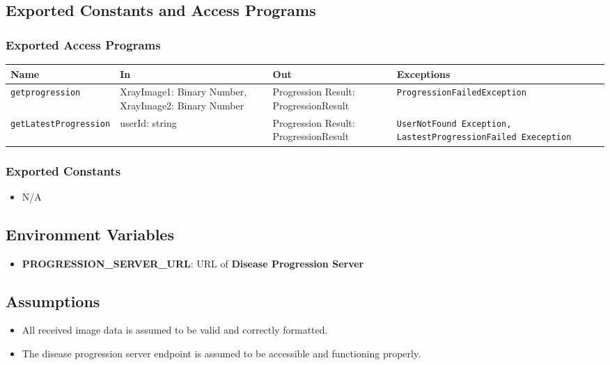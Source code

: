 \documentclass[12pt, titlepage]{article}
\begin{document}
\subsection{Exported Constants and Access Programs}
\subsubsection{Exported Access Programs}
\begin{center}
  \begin{tabular}{|p{4.5cm}|p{2.5cm}|p{3.5cm}|p{6cm}|}
    \hline
    \textbf{Name} & \textbf{In} & \textbf{Out} & \textbf{Exceptions} \\
    \hline
    \texttt{getprogression} & XrayImage1: Binary Number, \newline XrayImage2: Binary Number & Progression Result: \newline ProgressionResult & \texttt{ProgressionFailedException} \\
    \hline
    \texttt{getLatestProgression} & userId: string & Progression Result: \newline ProgressionResult & \texttt{UserNotFound Exception, LastestProgressionFailed Exeception} \\
    \hline
  \end{tabular}
\end{center}

\subsubsection{Exported Constants}
\begin{itemize}
    \item N/A
\end{itemize}

\subsection{Environment Variables}
\begin{itemize}
  \item \textbf{PROGRESSION\_SERVER\_URL}: URL of \textbf{Disease Progression Server}

\end{itemize}

\subsection{Assumptions}
\begin{itemize}
    \item All received image data is assumed to be valid and correctly formatted.
    \item The disease progression server endpoint is assumed to be accessible and functioning properly.
\end{itemize}
\end{document}
